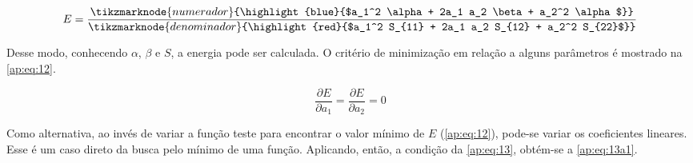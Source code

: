 \begin{figure}[htb]
    \vspace{2\baselineskip}
\begin{equation}
\label{ap:eq:12}
    E = \frac{\tikzmarknode{numerador}{\highlight{blue}{$a_1^2 \alpha + 2a_1 a_2 \beta + a_2^2 \alpha$}}}{\tikzmarknode{denominador}{\highlight{red}{$a_1^2 S_{11} + 2a_1 a_2 S_{12} + a_2^2 S_{22}$}}}
\end{equation}
\end{figure}

Desse modo, conhecendo $\alpha$, $\beta$ e $S$, a energia pode ser calculada. O critério de minimização em relação a alguns parâmetros é mostrado na \autoref{ap:eq:12}.

\begin{figure}[htb]
    \vspace{1\baselineskip}
\begin{equation}
\label{ap:eq:13}
    \frac{\partial E}{\partial a_1} = \frac{\partial E}{\partial a_2} = 0
\end{equation}
\end{figure}

Como alternativa, ao invés de variar a função teste para encontrar o valor mínimo de $E$ (\autoref{ap:eq:12}), pode-se variar os coeficientes lineares. Esse é um caso direto da busca pelo mínimo de uma função. Aplicando, então, a condição da \autoref{ap:eq:13}, obtém-se a \autoref{ap:eq:13a1}.

